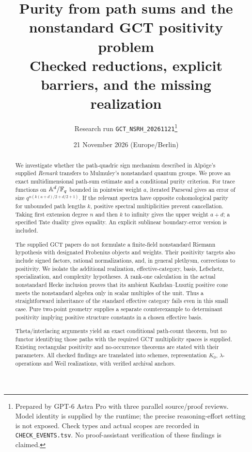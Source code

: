 \documentclass[11pt,a4paper]{article}
\title{Purity from path sums and the nonstandard GCT positivity problem\\[4pt]\large Checked reductions, explicit barriers, and the missing realization}
\author{Research run \texttt{GCT\_NSRH\_20261121}\thanks{Prepared by GPT-6 Astra Pro with three parallel source/proof reviews. Model identity is supplied by the runtime; the precise reasoning-effort setting is not exposed. Check types and actual scopes are recorded in \texttt{CHECK\_EVENTS.tsv}. No proof-assistant verification of these findings is claimed.}}
\date{21 November 2026 (Europe/Berlin)}
\newcommand{\A}{\mathbb A}\newcommand{\PP}{\mathbb P}\newcommand{\GL}{\mathrm{GL}}
\theoremstyle{named}\newtheorem{finding}{Finding}[section]
\theoremstyle{definition}\newtheorem{definition}[finding]{Definition}
\theoremstyle{remark}\newtheorem{remark}[finding]{Remark}
\begin{document}
\maketitle
\begin{abstract}
We investigate whether the path-quadric sign mechanism described in Alp\"oge's supplied \emph{Remark} transfers to Mulmuley's nonstandard quantum groups. We prove an exact multidimensional path-sum estimate and a conditional purity criterion. For trace functions on $\A^d/\F_q$ bounded in pointwise weight $a$, iterated Parseval gives an error of size $q^{n(k(a+d)/2+d/2+1)}$. If the relevant spectra have opposite cohomological parity for unbounded path lengths $k$, positive spectral multiplicities prevent cancellation. Taking first extension degree $n$ and then $k$ to infinity gives the upper weight $a+d$; a specified Tate duality gives equality. An explicit sublinear boundary-error version is included.

The supplied GCT papers do not formulate a finite-field nonstandard Riemann hypothesis with designated Frobenius objects and weights. Their positivity targets also include signed factors, rational normalizations, and, in general plethysm, corrections to positivity. We isolate the additional realization, effective-category, basis, Lefschetz, specialization, and complexity hypotheses. A rank-one calculation in the actual nonstandard Hecke inclusion proves that its ambient Kazhdan--Lusztig positive cone meets the nonstandard algebra only in scalar multiples of the unit. Thus a straightforward inheritance of the standard effective category fails even in this small case. Pure two-point geometry supplies a separate counterexample to determinant positivity implying positive structure constants in a chosen effective basis.

Theta/interlacing arguments yield an exact conditional path-count theorem, but no functor identifying those paths with the required GCT multiplicity spaces is supplied. Existing rectangular positivity and no-occurrence theorems are stated with their parameters. All checked findings are translated into schemes, representation $K_0$, $\lambda$-operations and Weil realizations, with verified archival anchors.
\end{abstract}
\begin{center}
\end{center}
\tableofcontents\newpage
\end{document}
